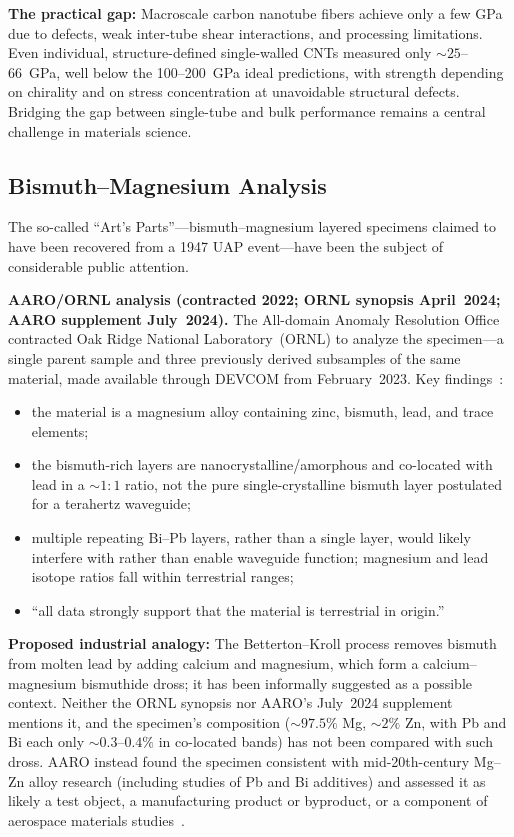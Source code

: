 \documentclass[aps,prd,twocolumn,superscriptaddress,nofootinbib,floatfix]{revtex4-2}
\begin{document}
\textbf{The practical gap:} Macroscale carbon nanotube fibers achieve only a few
GPa due to defects, weak inter-tube shear interactions, and processing
limitations. Even individual, structure-defined single-walled CNTs measured only
${\sim}25$--\SI{66}{GPa}, well below the 100--\SI{200}{GPa} ideal predictions,
with strength depending on chirality and on stress concentration at unavoidable
structural defects. Bridging the gap between single-tube and bulk performance
remains a central challenge in materials science.

\subsection{Bismuth--Magnesium Analysis}\label{sec:bismuth-mg}

The so-called ``Art's Parts''---bismuth--magnesium layered specimens claimed to
have been recovered from a 1947 UAP event---have been the subject of considerable
public attention.

\textbf{AARO/ORNL analysis (contracted 2022; ORNL synopsis April~2024; AARO
supplement July~2024).} The All-domain Anomaly Resolution Office contracted Oak
Ridge National Laboratory~(ORNL) to analyze the specimen---a single parent sample
and three previously derived subsamples of the same material, made available
through DEVCOM from February~2023. Key findings~\cite{AARO_ORNL2024}:
\begin{itemize}
  \item the material is a magnesium alloy containing zinc, bismuth, lead, and
        trace elements;
  \item the bismuth-rich layers are nanocrystalline/amorphous and co-located with
        lead in a ${\sim}1{:}1$ ratio, not the pure single-crystalline bismuth
        layer postulated for a terahertz waveguide;
  \item multiple repeating Bi--Pb layers, rather than a single layer, would likely
        interfere with rather than enable waveguide function; magnesium and lead
        isotope ratios fall within terrestrial ranges;
  \item ``all data strongly support that the material is terrestrial in
        origin.''
\end{itemize}

\textbf{Proposed industrial analogy:} The Betterton--Kroll process removes bismuth
from molten lead by adding calcium and magnesium, which form a
calcium--magnesium bismuthide dross; it has been informally suggested as a
possible context. Neither the ORNL synopsis nor AARO's July~2024 supplement
mentions it, and the specimen's composition (${\sim}97.5\%$ Mg, ${\sim}2\%$ Zn,
with Pb and Bi each only ${\sim}0.3$--$0.4\%$ in co-located bands) has not been
compared with such dross. AARO instead found the specimen consistent with
mid-20th-century Mg--Zn alloy research (including studies of Pb and Bi additives)
and assessed it as likely a test object, a manufacturing product or byproduct, or
a component of aerospace materials studies~\cite{AARO_ORNL2024}.
\end{document}
